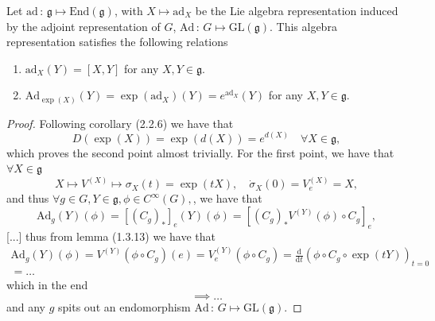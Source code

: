 \begin{corollary}
    Let \(\mathrm{ad} \,:\, \mathfrak{g} \mapsto \mathrm{End}(\mathfrak{g}) \), with \(X \mapsto \mathrm{ad}_X \) be the Lie algebra representation induced by the adjoint representation of \(G\), \(\mathrm{Ad}\,:\, G \mapsto \mathrm{GL}(\mathfrak{g}) \). This algebra representation satisfies the following relations
    \begin{enumerate}
        \item \(\mathrm{ad}_X (Y) = [X, Y] \) for any \(X, Y \in \mathfrak{g}\).
        \item \(\mathrm{Ad}_{\exp(X)} (Y)= \exp(\mathrm{ad}_X)(Y) = e^{\mathrm{ad}_X } (Y)\) for any \(X, Y \in \mathfrak{g}\).
    \end{enumerate}
\end{corollary}
\begin{proof}
    Following corollary (2.2.6) we have that
    \[
        D(\exp(X)) = \exp(d(X)) = e^{d(X)} \quad \forall X \in \mathfrak{g},
    \]
    which proves the second point almost trivially. For the first point, we have that \(\forall X \in \mathfrak{g}\)
    \[
        X \mapsto V^{(X)} \mapsto \sigma_X(t) = \exp(tX), \quad \dot{\sigma}_X(0) = V^{(X)}_e = X,
    \]
    and thus \(\forall g \in G, Y \in \mathfrak{g}, \phi \in C^{\infty}(G),\), we have that
    \[
        \mathrm{Ad}_g (Y)(\phi) = [(C_g)_*]_e (Y)(\phi) = [(C_g)_* V^{(Y)}(\phi) \circ C_g]_e,
    \]
    [...]
    thus from lemma (1.3.13) we have that
    \[
        \begin{aligned}
            \mathrm{Ad}_g (Y)(\phi) = V^{(Y)}(\phi \circ C_g)(e) = V^{(Y)}_e(\phi \circ C_g) = \frac{\mathrm{d}}{\mathrm{d} t} (\phi \circ C_g \circ \exp(tY))_{t=0} \\
            = \dots
        \end{aligned}
    \]
    which in the end
    \[
        \implies \dots
    \]
    and any \(g\) spits out an endomorphism \(\mathrm{Ad} \,:\, G \mapsto \mathrm{GL}(\mathfrak{g}) \).
\end{proof}

